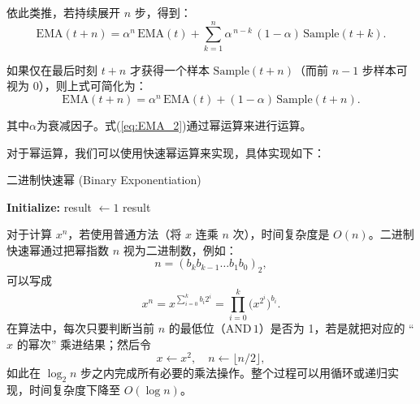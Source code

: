 依此类推，若持续展开 \(n\) 步，得到：
\begin{equation}
\text{EMA}(t+n) = \alpha^n \,\text{EMA}(t) + \sum_{k=1}^{n} \alpha^{\,n-k} \, (1-\alpha) \,\text{Sample}(t+k).
\end{equation}

如果仅在最后时刻 $t+n$ 才获得一个样本 $\text{Sample}(t+n)$（而前 $n-1$ 步样本可视为 0），则上式可简化为：
\begin{equation}
\label{eq:EMA_2}
\text{EMA}(t+n) = \alpha^n \,\text{EMA}(t) + (1-\alpha) \,\text{Sample}(t+n).
\end{equation}

其中\(\alpha\)为衰减因子。式(\ref{eq:EMA_2})通过幂运算来进行运算。

对于幂运算，我们可以使用快速幂运算来实现，具体实现如下：

\begin{algorithm}[H]
    \caption{二进制快速幂 (Binary Exponentiation)}
    \label{alg:fast_exp}
    \SetAlgoLined
    
    
    \textbf{Initialize:} result $\gets 1$\;
    \Return result\;
    
\end{algorithm}


对于计算 \(x^n\)，若使用普通方法（将 \(x\) 连乘 \(n\) 次），时间复杂度是 \(O(n)\)。二进制快速幂通过把幂指数 \(n\) 视为二进制数，例如：
\begin{equation}
n = (b_k b_{k-1} \ldots b_1 b_0)_2,
\end{equation}
可以写成
\begin{equation}
x^n
= x^{\sum_{i=0}^{k} b_i 2^i}
= \prod_{i=0}^k \bigl( x^{2^i} \bigr)^{b_i}.
\end{equation}
在算法中，每次只要判断当前 \(n\) 的最低位（\(\mathrm{AND}\,1\)）是否为 1，若是就把对应的 “\(x\) 的幂次” 乘进结果；然后令
\begin{equation}
x \gets x^2,
\quad
n \gets \lfloor n/2 \rfloor,
\end{equation}
如此在 \(\log_2 n\) 步之内完成所有必要的乘法操作。整个过程可以用循环或递归实现，时间复杂度下降至 \(O(\log n)\)。


